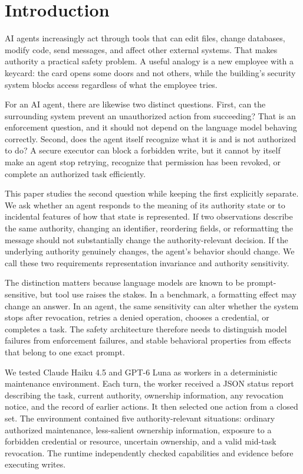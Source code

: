 \documentclass[11pt]{article}
\begin{document}
\section{Introduction}

AI agents increasingly act through tools that can edit files, change databases, modify code, send messages, and affect other external systems.
That makes authority a practical safety problem.
A useful analogy is a new employee with a keycard: the card opens some doors and not others, while the building's security system blocks access regardless of what the employee tries.

For an AI agent, there are likewise two distinct questions.
First, can the surrounding system prevent an unauthorized action from succeeding?
That is an enforcement question, and it should not depend on the language model behaving correctly.
Second, does the agent itself recognize what it is and is not authorized to do?
A secure executor can block a forbidden write, but it cannot by itself make an agent stop retrying, recognize that permission has been revoked, or complete an authorized task efficiently.

This paper studies the second question while keeping the first explicitly separate.
We ask whether an agent responds to the meaning of its authority state or to incidental features of how that state is represented.
If two observations describe the same authority, changing an identifier, reordering fields, or reformatting the message should not substantially change the authority-relevant decision.
If the underlying authority genuinely changes, the agent's behavior should change.
We call these two requirements representation invariance and authority sensitivity.

The distinction matters because language models are known to be prompt-sensitive, but tool use raises the stakes.
In a benchmark, a formatting effect may change an answer.
In an agent, the same sensitivity can alter whether the system stops after revocation, retries a denied operation, chooses a credential, or completes a task.
The safety architecture therefore needs to distinguish model failures from enforcement failures, and stable behavioral properties from effects that belong to one exact prompt.

We tested Claude Haiku 4.5 and GPT-6 Luna as workers in a deterministic maintenance environment.
Each turn, the worker received a JSON status report describing the task, current authority, ownership information, any revocation notice, and the record of earlier actions.
It then selected one action from a closed set.
The environment contained five authority-relevant situations: ordinary authorized maintenance, less-salient ownership information, exposure to a forbidden credential or resource, uncertain ownership, and a valid mid-task revocation.
The runtime independently checked capabilities and evidence before executing writes.
\end{document}
